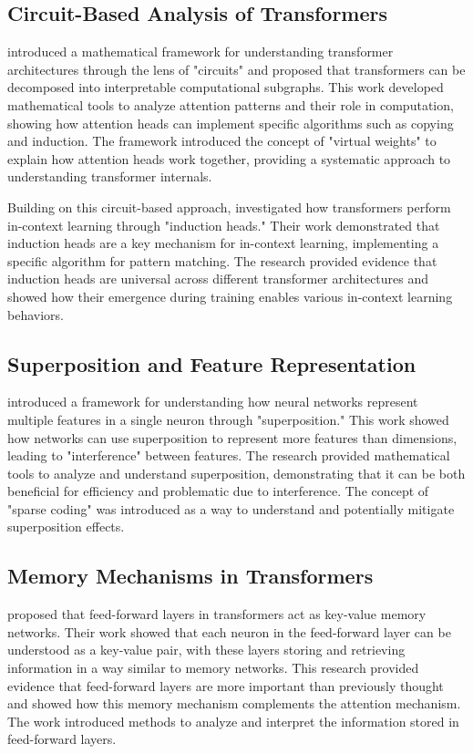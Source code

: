 \subsection{Circuit-Based Analysis of Transformers}

\citet{elhage2021mathematical} introduced a mathematical framework for understanding transformer architectures through the lens of "circuits" and proposed that transformers can be decomposed into interpretable computational subgraphs. This work developed mathematical tools to analyze attention patterns and their role in computation, showing how attention heads can implement specific algorithms such as copying and induction. The framework introduced the concept of "virtual weights" to explain how attention heads work together, providing a systematic approach to understanding transformer internals.

Building on this circuit-based approach, \citet{olsson2022inductionheads} investigated how transformers perform in-context learning through "induction heads." Their work demonstrated that induction heads are a key mechanism for in-context learning, implementing a specific algorithm for pattern matching. The research provided evidence that induction heads are universal across different transformer architectures and showed how their emergence during training enables various in-context learning behaviors.

\subsection{Superposition and Feature Representation}

\citet{elhage2022toy} introduced a framework for understanding how neural networks represent multiple features in a single neuron through "superposition." This work showed how networks can use superposition to represent more features than dimensions, leading to "interference" between features. The research provided mathematical tools to analyze and understand superposition, demonstrating that it can be both beneficial for efficiency and problematic due to interference. The concept of "sparse coding" was introduced as a way to understand and potentially mitigate superposition effects.

\subsection{Memory Mechanisms in Transformers}

\citet{geva2021memory} proposed that feed-forward layers in transformers act as key-value memory networks. Their work showed that each neuron in the feed-forward layer can be understood as a key-value pair, with these layers storing and retrieving information in a way similar to memory networks. This research provided evidence that feed-forward layers are more important than previously thought and showed how this memory mechanism complements the attention mechanism. The work introduced methods to analyze and interpret the information stored in feed-forward layers.

